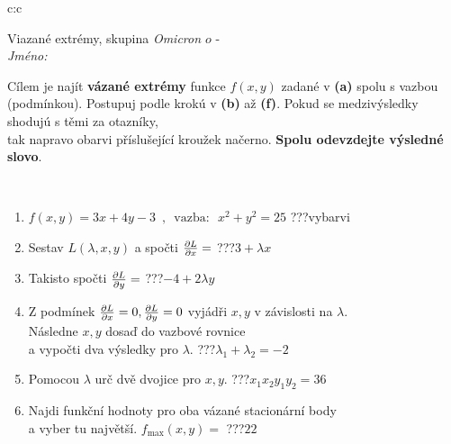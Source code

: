 \documentclass[10pt]{report}
\newcommand\omicron{o}
\begin{document}
\begin{tabular}{c:c}
\begin{minipage}[c][104.5mm][t]{0.5\linewidth}
\begin{center}
\vspace{7mm}
{\huge Viazané extrémy, skupina \textit{Omicron $\omicron$} -}\\[5mm]
\textit{Jméno:}\phantom{xxxxxxxxxxxxxxxxxxxxxxxxxxxxxxxxxxxxxxxxxxxxxxxxxxxxxxxxxxxxxxxxx}\\[5mm]
\begin{minipage}{0.95\linewidth}
\begin{center}
Cílem je najít \textbf{vázané extrémy} funkce $f(x,y)$ zadané v \textbf{(a)} spolu s vazbou (podmínkou). Postupuj podle krokú v \textbf{(b)} až \textbf{(f)}. Pokud se medzivýsledky shodujú s těmi za otazníky,\\tak napravo obarvi příslušející kroužek načerno. \textbf{Spolu odevzdejte výsledné slovo}.
\end{center}
\end{minipage}
\\[1mm]
\begin{minipage}{0.79\linewidth}
\begin{center}
\begin{varwidth}{\linewidth}
\begin{enumerate}
\normalsize
\item $f(x,y)=3x+4y-3 \enspace , \enspace \mathrm{vazba:} \enspace x^2+y^2=25$\quad \dotfill\; ???\;\dotfill \quad vybarvi
\item Sestav $L(\lambda,x,y)$ a spočti $\pdv{L}{x}=$\quad \dotfill\; ???\;\dotfill \quad $3+\lambda x$
\item Takisto spočti $\pdv{L}{y}=$\quad \dotfill\; ???\;\dotfill \quad $-4+2\lambda y$
\item Z podmínek $\pdv{L}{x}=0 , \pdv{L}{y}=0$ vyjádři $x,y$ v závislosti na $\lambda$.\\ \phantom{xxxxxx}Následne $x,y$ dosaď do vazbové rovnice\\ \phantom{xxxxxx}a vypočti dva výsledky pro $\lambda$.\quad \dotfill\; ???\;\dotfill \quad $\lambda_1+\lambda_2=-2$
\item Pomocou $\lambda$ urč dvě dvojice pro $x,y$.\quad \dotfill\; ???\;\dotfill \quad $x_1 x_2 y_1 y_2=36$
\item Najdi funkční hodnoty pro oba vázané stacionární body\\ \phantom{xxxxxx}a vyber tu najvětší. $f_{\text{max}}(x,y)=$\quad \dotfill\; ???\;\dotfill \quad $22$

\end{enumerate}
\end{varwidth}
\end{center}
\end{minipage}
\end{center}
\end{minipage}
\end{tabular}
\end{document}
